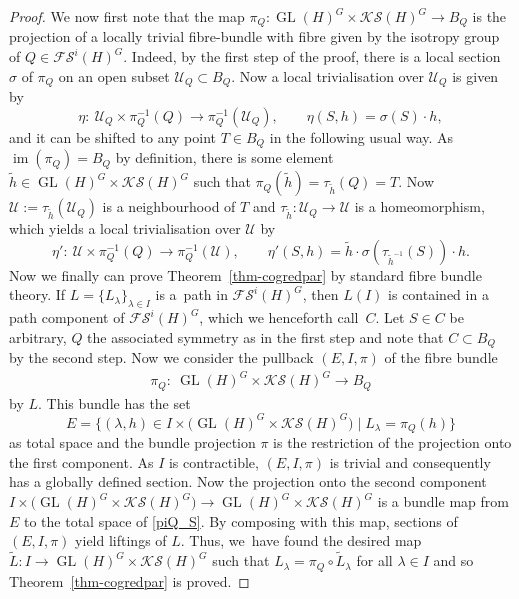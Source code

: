 \documentclass[pdftex]{sigma}
\numberwithin{equation}{section}
\theoremstyle{definition}
\DeclareMathOperator{\im}{im}
\DeclareMathOperator{\GL}{GL}
\begin{document}
\begin{proof}
We now first note that the map $\pi_Q \colon \GL(H)^G\times\mathcal{KS}(H)^G\rightarrow B_Q$ is the projection of a locally trivial fibre-bundle with fibre given by the isotropy group of $Q\in\mathcal{FS}^i(H)^G$. Indeed, by the first step of the proof, there is a local section $\sigma$ of $\pi_Q$ on an open subset $\mathcal{U}_Q\subset B_Q$. Now a local trivialisation over $\mathcal{U}_Q$ is given by
\[\eta \colon \ \mathcal{U}_Q\times\pi^{-1}_Q(Q)\rightarrow\pi^{-1}_Q(\mathcal{U}_Q),\qquad \eta(S,h)=\sigma(S)\cdot h,\]
and it can be shifted to any point $T\in B_Q$ in the following usual way. As $\im(\pi_Q)=B_Q$ by definition, there is some element $\tilde{h}\in \GL(H)^G\times\mathcal{KS}(H)^G$ such that $\pi_Q(\tilde{h})=\tau_{\tilde{h}}(Q)=T$. Now $\mathcal{U}:=\tau_{\tilde{h}}(\mathcal{U}_Q)$ is a neighbourhood of $T$ and $\tau_{\tilde{h}} \colon \mathcal{U}_Q\rightarrow\mathcal{U}$ is a homeomorphism, which yields a local trivialisation over $\mathcal{U}$ by
\[\eta' \colon \ \mathcal{U}\times\pi^{-1}_Q(Q)\rightarrow\pi^{-1}_Q(\mathcal{U}),\qquad \eta'(S,h)=\tilde{h}\cdot\sigma(\tau_{\tilde{h}^{-1}}(S))\cdot h.\]
Now we finally can prove Theorem~\ref{thm-cogredpar} by standard fibre bundle theory. If $L=\{L_\lambda\}_{\lambda\in I}$ is a~path in $\mathcal{FS}^i(H)^G$, then $L(I)$ is contained in a path component of $\mathcal{FS}^i(H)^G$, which we henceforth call~$C$. Let $S\in C$ be arbitrary, $Q$ the associated symmetry as in the first step and note that $C\subset B_{Q}$ by the second step. Now we consider the pullback $(E,I,\pi)$ of the fibre bundle
\begin{align}\label{piQ_S}
\pi_{Q} \colon \ \GL(H)^G\times\mathcal{KS}(H)^G\rightarrow B_{Q}
\end{align}
by $L$. This bundle has the set
\[E=\bigl\{(\lambda,h)\in I\times \bigl(\GL(H)^G\times\mathcal{KS}(H)^G\bigr) \mid L_\lambda=\pi_Q(h)\bigr\}\]
as total space and the bundle projection $\pi$ is the restriction of the projection onto the first component. As $I$ is contractible, $(E,I,\pi)$ is trivial and consequently has a globally defined section. Now the projection onto the second component $I\times\bigl(\GL(H)^G\times\mathcal{KS}(H)^G\bigr)\rightarrow\GL(H)^G\times\mathcal{KS}(H)^G$ is a bundle map from $E$ to the total space of \eqref{piQ_S}. By composing with this map, sections of $(E,I,\pi)$ yield liftings of $L$. Thus, we~have found the desired map $\tilde{L} \colon I\rightarrow\GL(H)^G\times\mathcal{KS}(H)^G$ such that $L_\lambda=\pi_Q\circ\tilde{L}_\lambda$ for all $\lambda\in I$ and so Theorem~\ref{thm-cogredpar} is proved.
\end{proof}
\end{document}
